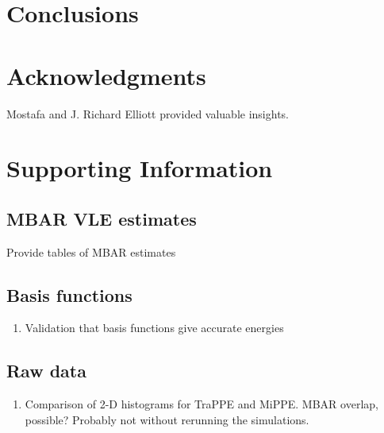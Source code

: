\documentclass[journal=jced,manuscript=article]{achemso}
\begin{document}
\section{Conclusions} \label{sec: Conclusions}

\section{Acknowledgments}

Mostafa and J. Richard Elliott provided valuable insights.



\section{Supporting Information}

\subsection{MBAR VLE estimates}

Provide tables of MBAR estimates

\subsection{Basis functions}

\begin{enumerate}
	\item Validation that basis functions give accurate energies
\end{enumerate}

\subsection{Raw data}

\begin{enumerate}
	\item Comparison of 2-D histograms for TraPPE and MiPPE. MBAR overlap, possible? Probably not without rerunning the simulations.
\end{enumerate}
\end{document}
